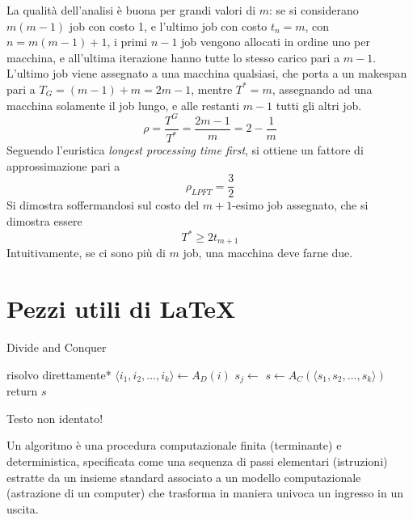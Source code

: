 La qualità dell'analisi è buona per grandi valori di $m$:
se si considerano $
m(m-1)
$ job con costo 1, e l'ultimo job con costo $
t_n = m
$, con $
n = 
m(m-1) + 1
$, i primi $n-1$ job vengono allocati in ordine uno per macchina, e all'ultima iterazione hanno tutte lo stesso carico pari a $m-1$.
L'ultimo job viene assegnato a una macchina qualsiasi, che porta a un makespan pari a $
T_G = (m-1)+m = 2m -1
$, mentre $T^* = m$, assegnando ad una macchina solamente il job lungo, e alle restanti $m-1$ tutti gli altri job.
\begin{equation*}
    \rho = \frac{
        T^G
    }{
        T^*
    }
    = \frac{2m-1}{m}
    = 2- \frac{1}{m}
\end{equation*}
Seguendo l'euristica \emph{longest processing time first}, si ottiene un fattore di approssimazione pari a 
\begin{equation*}
    \rho_{LPFT} = \frac{3}{2}
\end{equation*}
Si dimostra soffermandosi sul costo del $m+1$-esimo job assegnato, che si dimostra essere
\begin{equation*}
    T^* \geq 2 t_{m+1}
\end{equation*}
Intuitivamente, se ci sono più di $m$ job, una macchina deve farne due.

\section{Pezzi utili di \LaTeX{}}
\begin{algorithm}[H]
\caption{Divide and Conquer}\label{alg:dnc}
\begin{algorithmic}[1]
            \State *risolvo direttamente*
        \EndIf
        \State $\langle i_1, i_2, \dots, i_k \rangle \gets A_D(i)$ 
            \State $s_j \gets $ 
        \EndFor
        \State $s \gets A_C(\langle s_1, s_2, \dots, s_k \rangle)$
        \State return $s$
    \EndProcedure
\end{algorithmic}
\end{algorithm}
\noindent
Testo non identato!

\begin{definition}[Algoritmo]\label{def:algex}
    Un algoritmo è una procedura computazionale finita (terminante) e deterministica, specificata come una sequenza di passi elementari (istruzioni) estratte da un insieme standard associato a un modello computazionale (astrazione di un computer) che trasforma in maniera univoca un ingresso in un uscita.
\end{definition}

